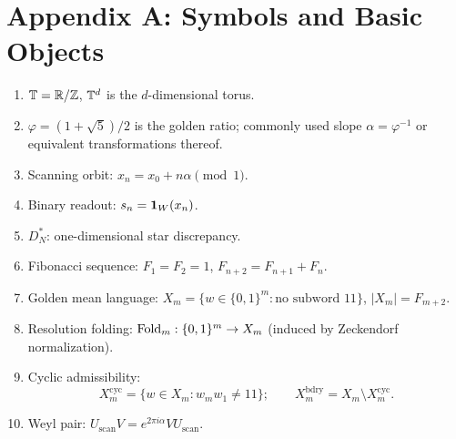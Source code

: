 \section{Appendix A: Symbols and Basic Objects}

\begin{enumerate}
  \item $\mathbb{T}=\mathbb{R}/\mathbb{Z}$, $\mathbb{T}^d$ is the $d$-dimensional torus.
  \item $\varphi=(1+\sqrt5)/2$ is the golden ratio; commonly used slope $\alpha=\varphi^{-1}$ or equivalent transformations thereof.
  \item Scanning orbit: $x_n=x_0+n\alpha\pmod1$.
  \item Binary readout: $s_n=\mathbf{1}_W(x_n)$.
  \item $D_N^*$: one-dimensional star discrepancy.
  \item Fibonacci sequence: $F_1=F_2=1$, $F_{n+2}=F_{n+1}+F_n$.
  \item Golden mean language: $X_m=\{w\in\{0,1\}^m:\text{no subword }11\}$, $|X_m|=F_{m+2}$.
  \item Resolution folding: $\mathrm{Fold}_m:\{0,1\}^m\to X_m$ (induced by Zeckendorf normalization).
  \item Cyclic admissibility:
  \[
  X_m^{\mathrm{cyc}}=\{w\in X_m:w_mw_1\neq 11\};
  \qquad
  X_m^{\mathrm{bdry}}=X_m\setminus X_m^{\mathrm{cyc}}.
  \]
  \item Weyl pair: $U_{\mathrm{scan}}V=e^{2\pi i\alpha}VU_{\mathrm{scan}}$.
\end{enumerate}
